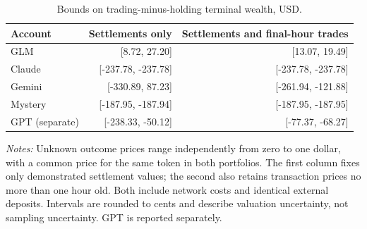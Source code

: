 \begin{table}[htbp]
\centering\small
\caption{Bounds on trading-minus-holding terminal wealth, USD.}
\label{tab:predictionbounds}
\begin{tabular}{lrr}
\toprule
Account & Settlements only & Settlements and final-hour trades\\
\midrule
GLM & [8.72, 27.20] & [13.07, 19.49] \\
Claude & [-237.78, -237.78] & [-237.78, -237.78] \\
Gemini & [-330.89, 87.23] & [-261.94, -121.88] \\
Mystery & [-187.95, -187.94] & [-187.95, -187.95] \\
GPT (separate) & [-238.33, -50.12] & [-77.37, -68.27] \\
\bottomrule
\end{tabular}
\begin{minipage}{0.98\linewidth}\footnotesize
\textit{Notes:} Unknown outcome prices range independently from zero to one
dollar, with a common price for the same token in both portfolios. The first
column fixes only demonstrated settlement values; the second also retains
transaction prices no more than one hour old. Both include network costs and
identical external deposits. Intervals are rounded to cents and describe
valuation uncertainty, not sampling uncertainty. GPT is reported separately.
\end{minipage}
\end{table}
